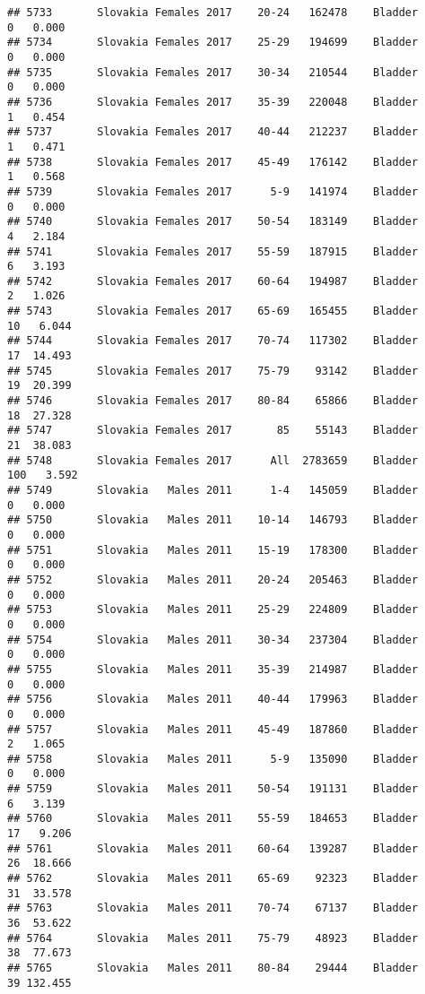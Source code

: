 \documentclass[
]{article}
\begin{document}
\begin{verbatim}
## 5733       Slovakia Females 2017    20-24   162478    Bladder      0   0.000
## 5734       Slovakia Females 2017    25-29   194699    Bladder      0   0.000
## 5735       Slovakia Females 2017    30-34   210544    Bladder      0   0.000
## 5736       Slovakia Females 2017    35-39   220048    Bladder      1   0.454
## 5737       Slovakia Females 2017    40-44   212237    Bladder      1   0.471
## 5738       Slovakia Females 2017    45-49   176142    Bladder      1   0.568
## 5739       Slovakia Females 2017      5-9   141974    Bladder      0   0.000
## 5740       Slovakia Females 2017    50-54   183149    Bladder      4   2.184
## 5741       Slovakia Females 2017    55-59   187915    Bladder      6   3.193
## 5742       Slovakia Females 2017    60-64   194987    Bladder      2   1.026
## 5743       Slovakia Females 2017    65-69   165455    Bladder     10   6.044
## 5744       Slovakia Females 2017    70-74   117302    Bladder     17  14.493
## 5745       Slovakia Females 2017    75-79    93142    Bladder     19  20.399
## 5746       Slovakia Females 2017    80-84    65866    Bladder     18  27.328
## 5747       Slovakia Females 2017       85    55143    Bladder     21  38.083
## 5748       Slovakia Females 2017      All  2783659    Bladder    100   3.592
## 5749       Slovakia   Males 2011      1-4   145059    Bladder      0   0.000
## 5750       Slovakia   Males 2011    10-14   146793    Bladder      0   0.000
## 5751       Slovakia   Males 2011    15-19   178300    Bladder      0   0.000
## 5752       Slovakia   Males 2011    20-24   205463    Bladder      0   0.000
## 5753       Slovakia   Males 2011    25-29   224809    Bladder      0   0.000
## 5754       Slovakia   Males 2011    30-34   237304    Bladder      0   0.000
## 5755       Slovakia   Males 2011    35-39   214987    Bladder      0   0.000
## 5756       Slovakia   Males 2011    40-44   179963    Bladder      0   0.000
## 5757       Slovakia   Males 2011    45-49   187860    Bladder      2   1.065
## 5758       Slovakia   Males 2011      5-9   135090    Bladder      0   0.000
## 5759       Slovakia   Males 2011    50-54   191131    Bladder      6   3.139
## 5760       Slovakia   Males 2011    55-59   184653    Bladder     17   9.206
## 5761       Slovakia   Males 2011    60-64   139287    Bladder     26  18.666
## 5762       Slovakia   Males 2011    65-69    92323    Bladder     31  33.578
## 5763       Slovakia   Males 2011    70-74    67137    Bladder     36  53.622
## 5764       Slovakia   Males 2011    75-79    48923    Bladder     38  77.673
## 5765       Slovakia   Males 2011    80-84    29444    Bladder     39 132.455

\end{verbatim}
\end{document}
